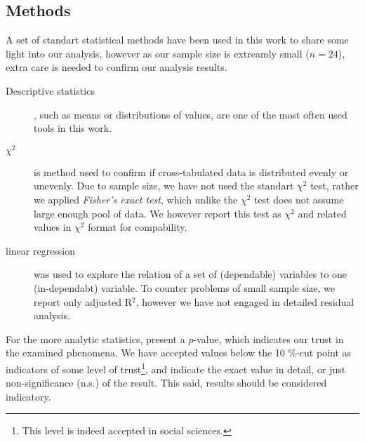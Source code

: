 \subsection{Methods}
\label{sec:methods}


A set of standart statistical methods have been used in this work to share some light into our analysis, however as our sample size is extreamly small ($n=24$), extra care is needed to confirm our analysis results.

\begin{description}
\item[Descriptive statistics], such as means or distributions of values, are one of the most often used tools in this work.
\item[$\chi^2$] is method used to confirm if cross-tabulated data is distributed evenly or unevenly. Due to sample size, we have not used the standart $\chi^2$ test, rather we applied \textit{Fisher's exact test}, which unlike the $\chi^2$ test does not assume large enough pool of data. We however report this test as $\chi^2$ and related values in $\chi^2$ format for compability.
\item[linear regression] was used to explore the relation of a set of (dependable) variables to one (in-dependabt) variable. To counter problems of small sample size, we report only adjusted R$^2$, however we have not engaged in detailed residual analysis.
\end{description}

For the more analytic statistics, present a $p$-value, which indicates our trust in the examined phenomena. We have accepted values below the 10 \%-cut point as indicators of some level of trust\footnote{This level is indeed accepted in social sciences.}, and indicate the exact value in detail, or just non-significance (n.s.) of the result. This said, results should be considered indicatory.


